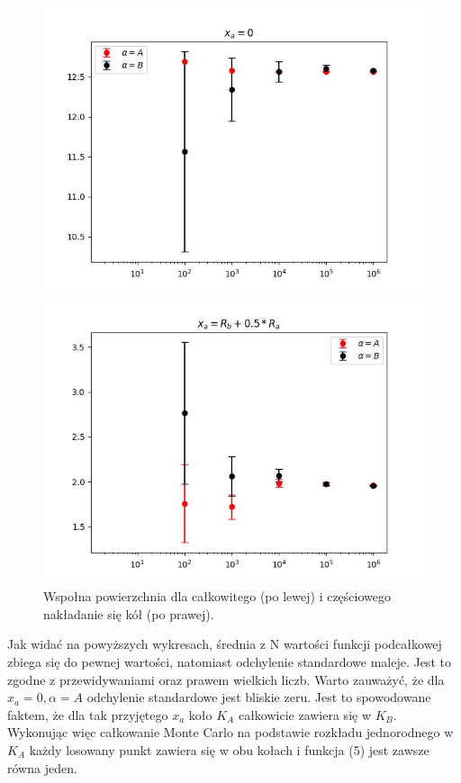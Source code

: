 \documentclass[a4paper,12pt,twoside]{article}
\begin{document}
 \begin{figure}[h!]
    \begin{minipage}{0.55\textwidth}
        \centering
        \includegraphics[scale = 0.5]{Carlo_4_2.jpg}
    \end{minipage}
    \begin{minipage}{0.55\textwidth}
        \includegraphics[scale = 0.5]{Carlo_4_3.jpg}
    \end{minipage}
    \caption{Wspołna powierzchnia dla całkowitego (po lewej) i częściowego nakładanie się kół (po prawej).  }
\end{figure}

Jak widać na powyższych wykresach, średnia z N wartości funkcji podcałkowej zbiega się do pewnej wartości, natomiast odchylenie standardowe maleje. Jest to zgodne z przewidywaniami oraz prawem wielkich liczb. Warto zauważyć, że dla $x_a = 0, \alpha = A$ odchylenie standardowe jest bliskie zeru. Jest to spowodowane faktem, że dla tak przyjętego $x_a$ koło $K_A$ całkowicie zawiera się w $K_B$. Wykonując więc całkowanie Monte Carlo na podstawie rozkładu jednorodnego w $K_A$ każdy losowany punkt zawiera się w obu kołach i funkcja (5) jest zawsze równa jeden. 
\end{document}
